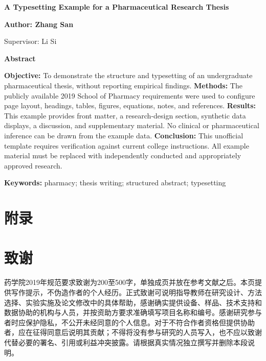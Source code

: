 \documentclass[12pt,a4paper,fontset=none]{ctexart}
\newcommand{\thesistitleeng}{A Typesetting Example for a Pharmaceutical Research Thesis}
\newcommand{\thesisauthoreng}{Zhang San}
\newcommand{\thesisadvisoreng}{Li Si}
\begin{document}
\par\medskip{}
\clearpage
\begin{center}{\bfseries{}\thesistitleeng}\par\medskip
{\bfseries{}Author: \thesisauthoreng\par Supervisor: \thesisadvisoreng}\par\medskip
\textbf{Abstract}\end{center}
\noindent\textbf{Objective:} To demonstrate the structure and typesetting of an undergraduate pharmaceutical thesis, without reporting empirical findings.
\textbf{Methods:} The publicly available 2019 School of Pharmacy requirements were used to configure page layout, headings, tables, figures, equations, notes, and references.
\textbf{Results:} This example provides front matter, a research-design section, synthetic data displays, a discussion, and supplementary material. No clinical or pharmaceutical inference can be drawn from the example data.
\textbf{Conclusion:} This unofficial template requires verification against current college instructions. All example material must be replaced with independently conducted and appropriately approved research.
\par\medskip\noindent\textbf{Keywords:} pharmacy; thesis writing; structured abstract; typesetting
\clearpage\tableofcontents
\clearpage{}\pagestyle{medical}

\clearpage\begingroup
\renewcommand{\bibsection}{\section*{参考文献}\addcontentsline{toc}{section}{参考文献}}
\renewcommand{\bibfont}{\songti\zihao{-4}}

\endgroup
\clearpage\section*{附录}

\clearpage\section*{致\quad 谢}
药学院2019年规范要求致谢为200至500字，单独成页并放在参考文献之后。本页提供写作提示，不伪造作者的个人经历。正式致谢可说明指导教师在研究设计、方法选择、实验实施及论文修改中的具体帮助，感谢确实提供设备、样品、技术支持和数据协助的机构与人员，并按资助方要求准确填写项目名称和编号。感谢研究参与者时应保护隐私，不公开未经同意的个人信息。对于不符合作者资格但提供协助者，应在征得同意后说明其贡献；不得将没有参与研究的人员写入，也不应以致谢代替必要的署名、引用或利益冲突披露。请根据真实情况独立撰写并删除本段说明。
\end{document}
